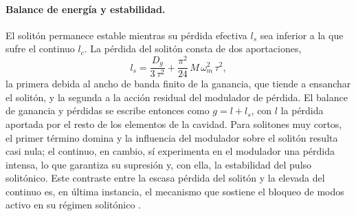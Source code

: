 \paragraph{Balance de energía y estabilidad.}
El solitón permanece estable mientras su pérdida efectiva $l_s$ sea inferior a la
que sufre el continuo $l_c$. La pérdida del solitón consta de dos aportaciones,
%
\begin{equation}
    l_s = \frac{D_g}{3\,\tau^2}
        + \frac{\pi^2}{24}\,M\,\omega_m^2\,\tau^2,
    \label{eq:perdida_soliton}
\end{equation}
%
la primera debida al ancho de banda finito de la ganancia, que tiende a ensanchar
el solitón, y la segunda a la acción residual del modulador de pérdida. El balance
de ganancia y pérdidas se escribe entonces como $g = l + l_s$, con $l$ la pérdida
aportada por el resto de los elementos de la cavidad. Para solitones muy cortos, el
primer término domina y la influencia del modulador sobre el solitón resulta casi
nula; el continuo, en cambio, sí experimenta en el modulador una pérdida intensa,
lo que garantiza su supresión y, con ella, la estabilidad del pulso solitónico.
Este contraste entre la escasa pérdida del solitón y la elevada del continuo es,
en última instancia, el mecanismo que sostiene el bloqueo de modos activo en su
régimen solitónico \cite{Haus2000,Keller2022}.
